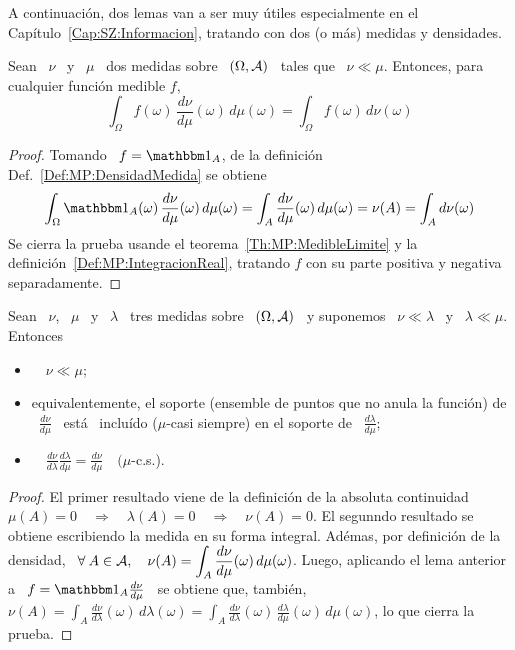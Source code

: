 A  continuaci\'on,  dos  lemas  van  a  ser muy  \'utiles  especialmente  en  el
Cap\'itulo~\ref{Cap:SZ:Informacion},  tratando  con  dos  (o  m\'as)  medidas  y
densidades.
%
\begin{lema}\label{Lem:RelacionIntegracionDerivadasRadon}
  Sean \  $\nu$ \ y \  $\mu$ \ dos medidas  sobre \ $(\Omega,\mathcal{A})$ \  tales que \
  $\nu \ll \mu$. Entonces, para cualquier funci\'on medible $f$,
  \[
  \int_\Omega   f(\omega)  \,   \frac{d\nu}{d\mu}(\omega)   \,  d\mu(\omega)   =
  \int_\Omega f(\omega) \, d\nu(\omega)
  \]
\end{lema}
%
\begin{proof}
  Tomando \ $f =  \un_A$, de la definici\'on Def.~\ref{Def:MP:DensidadMedida} se
  obtiene
  \[
  \int_\Omega  \un_A(\omega)  \,  \frac{d\nu}{d\mu}(\omega)  \,  d\mu(\omega)  =
  \int_A   \frac{d\nu}{d\mu}(\omega)   \,  d\mu(\omega)   =   \nu(A)  =   \int_A
  d\nu(\omega)
  \]
  Se  cierra   la  prueba  usande  el   teorema~\ref{Th:MP:MedibleLimite}  y  la
  definici\'on~\ref{Def:MP:IntegracionReal}, tratando $f$  con su parte positiva
  y negativa separadamente.
\end{proof}
%
\begin{lema}\label{Lem:RelacionesDerivadasRadon}
  Sean \ $\nu$, \ $\mu$ \ y \ $\lambda$ \ tres medidas sobre \ $(\Omega,\mathcal{A})$ \ y
  suponemos \ $\nu \ll \lambda$ \ y \ $\lambda \ll \mu$. Entonces
  \begin{itemize}
  \item $\quad \nu \ll \mu$;
  \item  equivalentemente,  el soporte  (ensemble  de  puntos  que no  anula  la
    funci\'on)  de \  $\displaystyle  \frac{d\nu}{d\mu}$ \  est\'a \  inclu\'ido
    ($\mu$-casi    siempre)    en     el    soporte    de    \    $\displaystyle
    \frac{d\lambda}{d\mu}$;
  \item  $\quad   \displaystyle  \frac{d\nu}{d\lambda}  \frac{d\lambda}{d\mu}  =
    \frac{d\nu}{d\mu} \quad (\mu$-c.s.).
\end{itemize}
\end{lema}
%
\begin{proof}
  El  primer resultado  viene  de  la definici\'on  de  la absoluta  continuidad
  $\mu(A) =  0 \quad  \Rightarrow \quad \lambda(A)  = 0 \quad  \Rightarrow \quad
  \nu(A) =  0$. El  segunndo resultado  se obtiene escribiendo  la medida  en su
  forma integral.  Ad\'emas, por definici\'on  de la densidad,  \ $\displaystyle
  \forall  \: A  \in  \mathcal{A},  \quad \nu(A)  =  \int_A \frac{d\nu}{d\mu}(\omega)  \,
  d\mu(\omega)$.   Luego,   aplicando  el   lema  anterior  a   \  $f   =  \un_A
  \frac{d\nu}{d\mu}$  \  se  obtiene  que,   tambi\'en,  \  $  \nu(A)  =  \int_A
  \frac{d\nu}{d\lambda}(\omega)      \,      d\lambda(\omega)      =      \int_A
  \frac{d\nu}{d\lambda}(\omega)      \,     \frac{d\lambda}{d\mu}(\omega)     \,
  d\mu(\omega)$, lo que cierra la prueba.
\end{proof}

